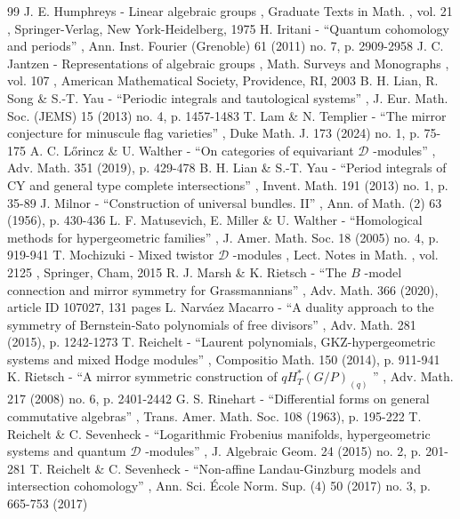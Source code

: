 \documentclass[11pt]{article}
\begin{document}
\begin{thebibliography}{99}
 J. E. Humphreys - Linear algebraic groups , Graduate Texts in Math. , vol. 21 , Springer-Verlag, New York-Heidelberg, 1975
 H. Iritani - “Quantum cohomology and periods” , Ann. Inst. Fourier (Grenoble) 61 (2011) no. 7, p. 2909-2958
 J. C. Jantzen - Representations of algebraic groups , Math. Surveys and Monographs , vol. 107 , American Mathematical Society, Providence, RI, 2003
 B. H. Lian, R. Song \& S.-T. Yau - “Periodic integrals and tautological systems” , J. Eur. Math. Soc. (JEMS) 15 (2013) no. 4, p. 1457-1483
 T. Lam \& N. Templier - “The mirror conjecture for minuscule flag varieties” , Duke Math. J. 173 (2024) no. 1, p. 75-175
 A. C. L\H{o}rincz \& U. Walther - “On categories of equivariant $\mathcal{D}$ -modules” , Adv. Math. 351 (2019), p. 429-478
 B. H. Lian \& S.-T. Yau - “Period integrals of CY and general type complete intersections” , Invent. Math. 191 (2013) no. 1, p. 35-89
 J. Milnor - “Construction of universal bundles. II” , Ann. of Math. (2) 63 (1956), p. 430-436
 L. F. Matusevich, E. Miller \& U. Walther - “Homological methods for hypergeometric families” , J. Amer. Math. Soc. 18 (2005) no. 4, p. 919-941
 T. Mochizuki - Mixed twistor $\mathcal{D}$ -modules , Lect. Notes in Math. , vol. 2125 , Springer, Cham, 2015
 R. J. Marsh \& K. Rietsch - “The $B$ -model connection and mirror symmetry for Grassmannians” , Adv. Math. 366 (2020), article ID 107027, 131 pages
 L. Narváez Macarro - “A duality approach to the symmetry of Bernstein-Sato polynomials of free divisors” , Adv. Math. 281 (2015), p. 1242-1273
 T. Reichelt - “Laurent polynomials, GKZ-hypergeometric systems and mixed Hodge modules” , Compositio Math. 150 (2014), p. 911-941
 K. Rietsch - “A mirror symmetric construction of $qH^\ast _T(G/P)_{(q)}$ ” , Adv. Math. 217 (2008) no. 6, p. 2401-2442
 G. S. Rinehart - “Differential forms on general commutative algebras” , Trans. Amer. Math. Soc. 108 (1963), p. 195-222
 T. Reichelt \& C. Sevenheck - “Logarithmic Frobenius manifolds, hypergeometric systems and quantum $\mathcal{D}$ -modules” , J. Algebraic Geom. 24 (2015) no. 2, p. 201-281
 T. Reichelt \& C. Sevenheck - “Non-affine Landau-Ginzburg models and intersection cohomology” , Ann. Sci. École Norm. Sup. (4) 50 (2017) no. 3, p. 665-753 (2017)

\end{thebibliography}
\end{document}
